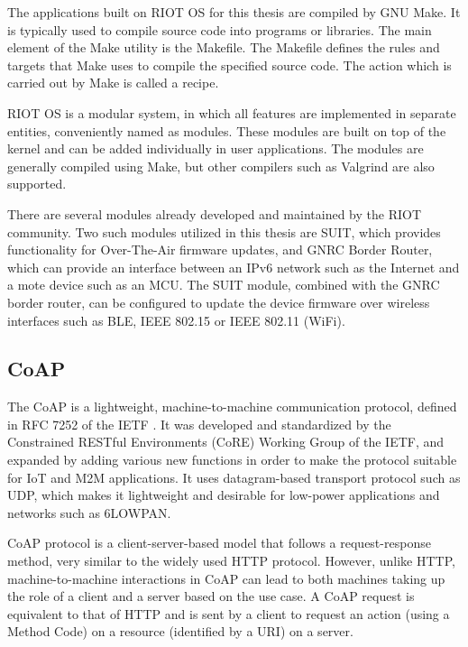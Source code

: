 The applications built on RIOT OS for this thesis are compiled by GNU Make. It is typically used to compile source code into programs or libraries. The main element of the Make utility is the Makefile. The Makefile defines the rules and targets that Make uses to compile the specified source code. The action which is carried out by Make is called a recipe.

RIOT OS is a modular system, in which all features are implemented in separate entities, conveniently named as modules. These modules are built on top of the kernel and can be added individually in user applications. The modules are generally compiled using Make, but other compilers such as Valgrind are also supported.

There are several modules already developed and maintained by the RIOT community. Two such modules utilized in this thesis are SUIT, which provides functionality for Over-The-Air firmware updates, and GNRC Border Router, which can provide an interface between an IPv6 network such as the Internet and a mote device such as an \acrshort{MCU}. The SUIT module, combined with the GNRC border router, can be configured to update the device firmware over wireless interfaces such as \acrfull{BLE}, IEEE 802.15 or IEEE 802.11 (\acrshort{WiFi}).

\subsection{CoAP}
The \acrfull{CoAP} is a lightweight, machine-to-machine communication protocol, defined in RFC 7252 of the IETF \cite{rfc7252}. It was developed and standardized by the Constrained RESTful Environments (CoRE) Working Group of the IETF, and expanded by adding various new functions in order to make the protocol suitable for \acrshort{IoT} and M2M applications. It uses datagram-based transport protocol such as UDP, which makes it lightweight and desirable for low-power applications and networks such as 6LOWPAN.

\acrshort{CoAP} protocol is a client-server-based model that follows a request-response method, very similar to the widely used HTTP protocol. However, unlike HTTP, machine-to-machine interactions in \acrshort{CoAP} can lead to both machines taking up the role of a client and a server based on the use case. A \acrshort{CoAP} request is equivalent to that of HTTP and is sent by a client to request an action (using a Method Code) on a resource (identified by a URI) on a server.

